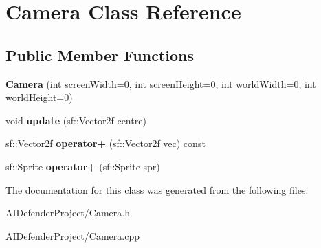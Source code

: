 \hypertarget{class_camera}{}\section{Camera Class Reference}
\label{class_camera}
\subsection*{Public Member Functions}
\begin{DoxyCompactItemize}
\item 
\mbox{\label{class_camera_a7827bfde3038e43f3ee29dc2173f90d1}} 
{\bfseries Camera} (int screen\+Width=0, int screen\+Height=0, int world\+Width=0, int world\+Height=0)
\item 
\mbox{\label{class_camera_a1336e459c3ff1ea383546d12ddbae790}} 
void {\bfseries update} (sf\+::\+Vector2f centre)
\item 
\mbox{\label{class_camera_a48842371f914137c7c5311789789633a}} 
sf\+::\+Vector2f {\bfseries operator+} (sf\+::\+Vector2f vec) const
\item 
\mbox{\label{class_camera_a5ad7481d9f6ca0c3374cddb2ba3d1ea8}} 
sf\+::\+Sprite {\bfseries operator+} (sf\+::\+Sprite spr)
\end{DoxyCompactItemize}


The documentation for this class was generated from the following files\+:\begin{DoxyCompactItemize}
\item 
A\+I\+Defender\+Project/Camera.\+h\item 
A\+I\+Defender\+Project/Camera.\+cpp\end{DoxyCompactItemize}
